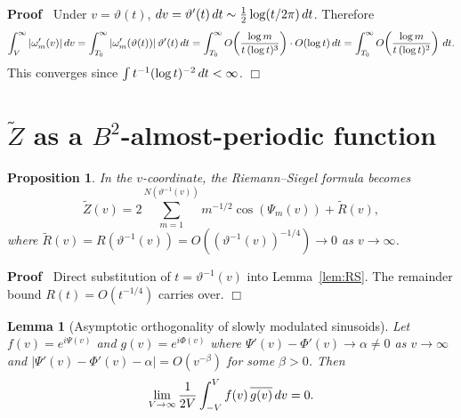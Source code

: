 \documentclass{article}
\newenvironment{proof}{\noindent\textbf{Proof\ }}{\hspace*{\fill}$\Box$\medskip}
\newtheorem{lemma}{Lemma}
\newtheorem{proposition}{Proposition}
{\theorembodyfont{\rmfamily}\newtheorem{remark}{Remark}}
\begin{document}
\begin{proof}
  Under $v = \vartheta (t)$, $dv = \vartheta' (t)  \hspace{0.17em} dt \sim
  \tfrac{1}{2} \log (t / 2 \pi)  \hspace{0.17em} dt$. Therefore
  \[ \int_V^{\infty} | \omega_m' (v) | \hspace{0.17em} dv =
     \int_{T_0}^{\infty} | \omega_m' (\vartheta (t)) |  \hspace{0.17em}
     \vartheta' (t)  \hspace{0.17em} dt = \int_{T_0}^{\infty} O
     \hspace{-0.17em} \left( \frac{\log m}{t \hspace{0.17em} (\log t)^3}
     \right) \cdot O (\log t)  \hspace{0.17em} dt = \int_{T_0}^{\infty} O
     \hspace{-0.17em} \left( \frac{\log m}{t \hspace{0.17em} (\log t)^2}
     \right)  \hspace{0.17em} dt. \]
  This converges since $\int t^{- 1} (\log t)^{- 2}  \hspace{0.17em} dt <
  \infty$.
\end{proof}

\section{$\tilde{Z}$ as a $B^2$-almost-periodic function}\label{sec:B2}

\begin{proposition}
  \label{prop:Ztilde-RS}In the $v$-coordinate, the Riemann--Siegel formula
  becomes
  \begin{equation}
    \label{eq:Ztilde-RS} \tilde{Z} (v) = 2 \sum_{m = 1}^{N (\vartheta^{- 1}
    (v))} m^{- 1 / 2} \cos (\Psi_m (v)) + \tilde{R} (v),
  \end{equation}
  where $\tilde{R} (v) = R (\vartheta^{- 1} (v)) = O ((\vartheta^{- 1} (v))^{-
  1 / 4}) \to 0$ as $v \to \infty$.
\end{proposition}

\begin{proof}
  Direct substitution of $t = \vartheta^{- 1} (v)$ into Lemma~\ref{lem:RS}.
  The remainder bound $R (t) = O (t^{- 1 / 4})$ carries over.
\end{proof}

\begin{lemma}
  [Asymptotic orthogonality of slowly modulated sinusoids]\label{lem:orthog}
  Let $f (v) = e^{i \Psi (v)}$ and $g (v) = e^{i \Phi (v)}$ where $\Psi' (v) -
  \Phi' (v) \to \alpha \ne 0$ as $v \to \infty$ and $| \Psi' (v) - \Phi' (v) -
  \alpha | = O (v^{- \beta})$ for some $\beta > 0$. Then
  \begin{equation}
    \label{eq:orthog} \lim_{V \to \infty}  \frac{1}{2 V}  \int_{- V}^V f (v)
    \hspace{0.17em} \overline{g (v)} \hspace{0.17em} dv = 0.
  \end{equation}
\end{lemma}
\end{document}

